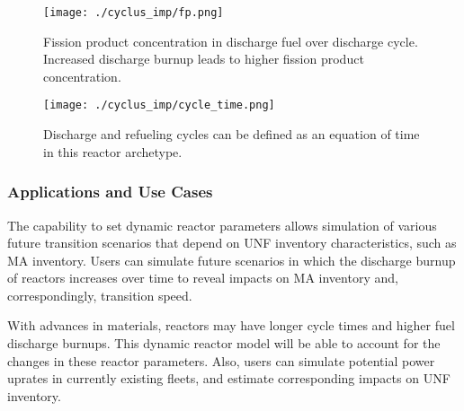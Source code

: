 \begin{figure}
    \centering
    \texttt{[image: ./cyclus\_imp/fp.png]}
    \caption{Fission product concentration in discharge fuel over discharge cycle. Increased discharge burnup leads to higher fission product concentration.}
    \label{fig:cyclus_fp}
\end{figure}


\begin{figure}
    \centering
    \texttt{[image: ./cyclus\_imp/cycle\_time.png]}
    \caption{Discharge and refueling cycles can be defined as an equation of time in this reactor archetype.}
    \label{fig:cyclus_time}
\end{figure}

\subsubsection{Applications and Use Cases}

The capability to set dynamic reactor parameters
allows simulation of various future transition scenarios
that depend on \gls{UNF} inventory characteristics,
such as \gls{MA} inventory. 
Users can simulate future scenarios in which the discharge
burnup of reactors increases over time to reveal
impacts on \gls{MA} inventory and, correspondingly,
transition speed. 

With
advances in materials, reactors may have longer
cycle times and higher fuel discharge burnups.
This dynamic reactor model will be able to account
for the changes in these reactor parameters.
Also, users can simulate potential
power uprates in currently existing fleets, and
estimate corresponding impacts on \gls{UNF} inventory.
\FloatBarrier